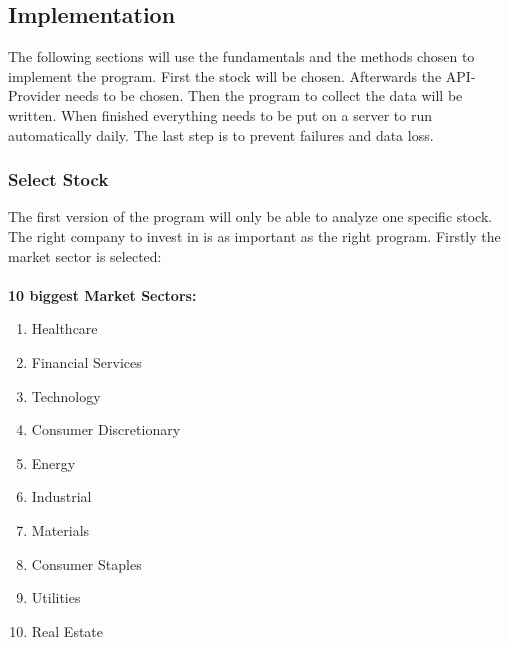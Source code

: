 \subsection{Implementation}\label{sec: Implementation}
The following sections will use the fundamentals and the methods chosen to implement the program. First the stock will be chosen. Afterwards the \ac{API}-Provider needs to be chosen. Then the program to collect the data will be written. When finished everything needs to be put on a server to run automatically daily. The last step is to prevent failures and data loss.
\subsubsection{Select Stock}\label{sec: Choose promising Stock}
The first version of the program will only be able to analyze one specific stock. The right company to invest in is as important as the right program.
Firstly the market sector is selected:\\
\\
\textbf{10 biggest Market Sectors:}
\begin{enumerate}
	\item Healthcare
	\item Financial Services
	\item Technology
	\item Consumer Discretionary
	\item Energy
	\item Industrial
	\item Materials
	\item Consumer Staples
	\item Utilities
	\item Real Estate\\
\end{enumerate}

